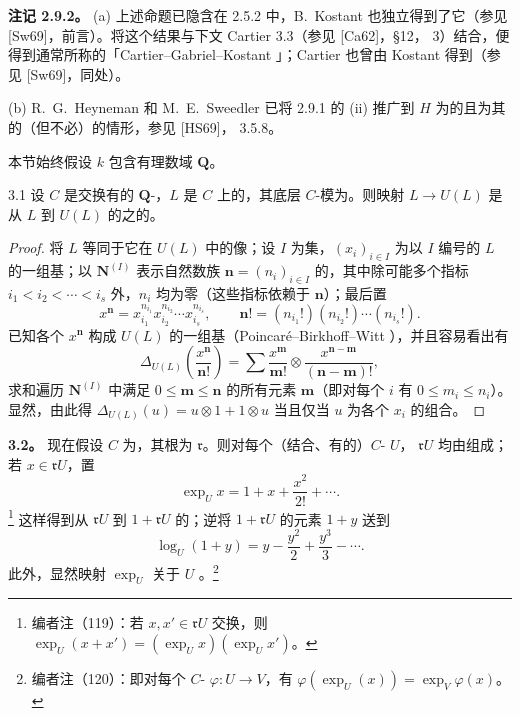 \textbf{注记 2.9.2。} (a) 上述命题已隐含在 2.5.2 中，B.~Kostant 也独立得到了它（参见 [Sw69]，前言）。将这个结果与下文 Cartier  3.3（参见 [Ca62]，§12， 3）结合，便得到通常所称的「Cartier--Gabriel--Kostant 」；Cartier 也曾由 Kostant 得到（参见 [Sw69]，同处）。

(b) R.~G.~Heyneman 和 M.~E.~Sweedler 已将 2.9.1 的 (ii) 推广到 $H$ 为的且为其的（但不必）的情形，参见 [HS69]， 3.5.8。

本节始终假设 $k$ 包含有理数域 $\mathbf Q$。
\begin{SGAresult}{}{3.1}
设 $C$ 是交换有的 $\mathbf Q$-，$L$ 是 $C$ 上的，其底层 $C$-模为。则映射 $L\to U(L)$ 是从 $L$ 到 $U(L)$ 的之的。
\end{SGAresult}
\begin{proof}
将 $L$ 等同于它在 $U(L)$ 中的像；设 $I$ 为集，$(x_i)_{i\in I}$ 为以 $I$ 编号的 $L$ 的一组基；以 $\mathbf N^{(I)}$ 表示自然数族 $\mathbf n=(n_i)_{i\in I}$ 的，其中除可能多个指标 $i_1<i_2<\cdots<i_s$ 外，$n_i$ 均为零（这些指标依赖于 $\mathbf n$）；最后置
\[
x^{\mathbf n}=x_{i_1}^{n_{i_1}}x_{i_2}^{n_{i_2}}\cdots x_{i_s}^{n_{i_s}},\qquad
\mathbf n!=(n_{i_1}!)(n_{i_2}!)\cdots(n_{i_s}!).
\]
已知各个 $x^{\mathbf n}$ 构成 $U(L)$ 的一组基（Poincaré--Birkhoff--Witt ），并且容易看出有
\[
\Delta_{U(L)}\left(\frac{x^{\mathbf n}}{\mathbf n!}\right)
=\sum\frac{x^{\mathbf m}}{\mathbf m!}\otimes\frac{x^{\mathbf n-\mathbf m}}{(\mathbf n-\mathbf m)!},\tag{*}
\]
求和遍历 $\mathbf N^{(I)}$ 中满足 $0\leq\mathbf m\leq\mathbf n$ 的所有元素 $\mathbf m$（即对每个 $i$ 有 $0\leq m_i\leq n_i$）。显然，由此得 $\Delta_{U(L)}(u)=u\otimes1+1\otimes u$ 当且仅当 $u$ 为各个 $x_i$ 的组合。
\end{proof}

\textbf{3.2。} 现在假设 $C$ 为，其根为 $\mathfrak r$。则对每个（结合、有的）$C$- $U$， $\mathfrak rU$ 均由组成；若 $x\in\mathfrak rU$，置
\[
\exp_Ux=1+x+\frac{x^2}{2!}+\cdots.
\]
\footnote{编者注（119）：若 $x,x'\in\mathfrak rU$ 交换，则 $\exp_U(x+x')=(\exp_Ux)(\exp_Ux')$。}
这样得到从 $\mathfrak rU$ 到 $1+\mathfrak rU$ 的；逆将 $1+\mathfrak rU$ 的元素 $1+y$ 送到
\[
\log_U(1+y)=y-\frac{y^2}{2}+\frac{y^3}{3}-\cdots.
\]
此外，显然映射 $\exp_U$ 关于 $U$ 。\footnote{编者注（120）：即对每个 $C$- $\varphi:U\to V$，有 $\varphi(\exp_U(x))=\exp_V\varphi(x)$。}

